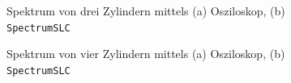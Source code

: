 \begin{figure}
    \caption{Spektrum von drei Zylindern mittels (a) Osziloskop, (b) \texttt{SpectrumSLC}}
\end{figure}
\begin{figure}
    \caption{Spektrum von vier Zylindern mittels (a) Osziloskop, (b) \texttt{SpectrumSLC}}
\end{figure}
